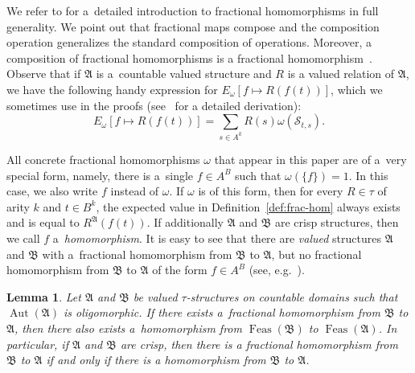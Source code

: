 \documentclass[preprint,12pt]{elsarticle}
\newcommand{\bA}{{\mathfrak A}}
\newcommand{\bB}{{\mathfrak B}}
\newcommand{\checked}[1]{#1}
\DeclareMathOperator{\Aut}{Aut}
\DeclareMathOperator{\Feas}{Feas}
\newtheorem{lemma}[theorem]{Lemma}
\begin{document}
We refer to \cite{Resilience-VCSPs} for a~detailed introduction to fractional homomorphisms in full generality. \checked{We point out that fractional maps compose and the composition operation generalizes the standard composition of operations. Moreover, a composition of fractional homomorphisms is a fractional homomorphism~\cite[Proposition 5.9]{Resilience-VCSPs-arxiv}.}
Observe that if $\bA$ is a~countable valued structure and $R$ is a valued relation of $\bA$, we have the following handy expression for $E_\omega[f \mapsto R(f(t))]$, which we sometimes use in the proofs (see~\cite{Resilience-VCSPs} for a detailed derivation):
\begin{equation}
\label{eq:expr-expect}
E_{\omega}[f \mapsto R(f(t))] = \sum_{s \in A^k} R(\checked{s}) \omega(
{\mathscr S}_{t,s}).
\end{equation}

All concrete fractional homomorphisms $\omega$ that appear in this paper are of a~very special form, namely, there is a~single $f \in A^B$ such that $\omega(\{f\}) =1$. In this case, we also write $f$ instead of $\omega$.
If $\omega$ is of this form, then for every $R \in \tau$ of arity $k$ and $t \in B^k$, the expected value in Definition~\ref{def:frac-hom} always exists and is equal to $R^\bA(f(t))$.
If additionally $\bA$ and $\bB$ are crisp structures, then we call $f$ a~\emph{homomorphism}. It is easy to see that there are \emph{valued} structures $\bA$ and $\bB$ with a~fractional homomorphism from $\bB$ to $\bA$, but no fractional homomorphism from $\bB$ to $\bA$ of the form $f \in A^B$ (see, e.g.~\cite[Example 2.6 and 3.15]{ThesisZaneta}). 
  
\begin{lemma}\label{lem:frac-hom}
Let $\bA$ and $\bB$ be 
valued $\tau$-structures on countable domains such that $\Aut(\bA)$ is oligomorphic. If there exists a~fractional homomorphism from $\bB$ to $\bA$, then there also exists a~homomorphism from $\Feas(\bB)$ to $\Feas(\bA)$.
In particular, if $\bA$ and $\bB$ are crisp, then there is a fractional homomorphism from $\bB$ to $\bA$ if and only if there is a homomorphism from $\bB$ to $\bA$. 
\end{lemma}
\end{document}

